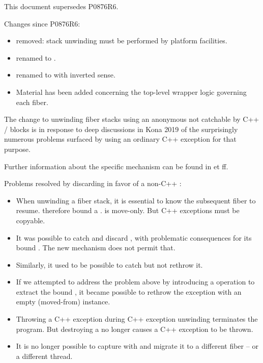 \label{history}
This document supersedes P0876R6.

Changes since P0876R6:

\begin{itemize}
    \item {} removed: stack unwinding must be
      performed by platform facilities.
    \item {} renamed to
      \canxtresume.
    \item {} renamed to  with inverted
      sense.
    \item Material has been added concerning the top-level wrapper
      logic governing each fiber.
\end{itemize}

The change to unwinding fiber stacks using an anonymous \foreignex not
catchable by C++  /  blocks is in response to deep
discussions in Kona 2019 of the surprisingly numerous problems surfaced by
using an ordinary C++ exception for that purpose.

Further information about the specific mechanism can be found in
 et ff.

Problems resolved by discarding \unwindex in favor of a non-C++ \foreignex:
\begin{itemize}
    \item When unwinding a fiber stack, it is essential to know the subsequent
          fiber to resume. \unwindex therefore bound a \fiber. \fiber is
          move-only. But C++ exceptions must be copyable.
    \item It was possible to catch and discard \unwindex, with problematic
          consequences for its bound \fiber. The new mechanism does not permit
          that.
    \item Similarly, it used to be possible to catch \unwindex but not rethrow it.
    \item If we attempted to address the problem above by introducing a
          \unwindex operation to extract the bound \fiber, it became possible
          to rethrow the exception with an empty (moved-from) \fiber instance.
    \item Throwing a C++ exception during C++ exception unwinding terminates
          the program. But destroying a \fiber no longer causes a C++
          exception to be thrown.
    \item It is no longer possible to capture \unwindex with
           and migrate it to a different fiber -- or
          a different thread.
\end{itemize}

